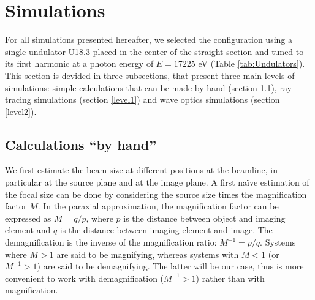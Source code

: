 \documentclass{iucr}              %
\begin{document}
\section{Simulations}

For all simulations presented hereafter, we selected the configuration using a single undulator U18.3 placed in the center of the straight section and tuned to its first harmonic at a photon energy of $E=17225$ eV (Table \ref{tab:Undulators}). This section is devided in three subsections, that present three main levels of simulations: simple calculations that can be made by hand (section \ref{level0}), ray-tracing simulations (section \ref{level1}) and wave optics simulations (section \ref{level2}).   

\subsection{Calculations ``by hand''}
\label{level0}

We first estimate the beam size at different positions at the beamline, in particular at the source plane and at the image plane. A first na{\"{i}}ve estimation of the focal size can be done by considering the source size times the magnification factor $M$. In the paraxial approximation, the magnification factor can be expressed as $M=q/p$, where $p$ is the distance between object and imaging element and $q$ is the distance between imaging element and image. The demagnification is the inverse of the magnification ratio: $M^{-1}=p/q$. Systems where $M>1$ are said to be magnifying, whereas systems with $M<1$ (or $M^{-1}>1$) are said to be demagnifying. The latter will be our case, thus is more convenient to work with demagnification ($M^{-1}>1$) rather than with magnification. 
\end{document}

